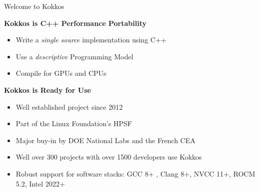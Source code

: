 




\begin{frame}{Welcome to Kokkos}

\textbf{Kokkos is C++ Performance Portability}
\begin{scriptsize}
  \begin{itemize} 
	  \item {Write a \textit{single source} implementation using C++}
	  \item {Use a \textit{descriptive} Programming Model}
	  \item {Compile for GPUs and CPUs}
  \end{itemize}
\end{scriptsize}

	\vspace{10pt}

\textbf{Kokkos is Ready for Use}
\begin{scriptsize}
  \begin{itemize} 
	  \item {Well established project since 2012}
          \item {Part of the Linux Foundation's HPSF}
	  \item {Major buy-in by DOE National Labs and the French CEA} 
	  \item {Well over 300 projects with over 1500 developers use Kokkos}
	  \item {Robust support for software stacks: GCC 8+ , Clang 8+, NVCC 11+, ROCM 5.2, Intel 2022+}
  \end{itemize}
\end{scriptsize}

\end{frame}


